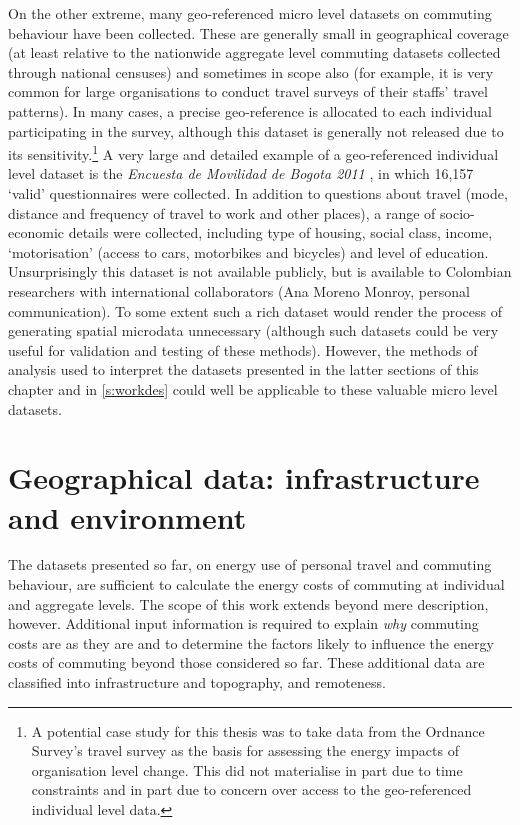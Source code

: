 On the other extreme, many geo-referenced micro level datasets on
commuting behaviour have been collected. These are generally small in geographical
coverage (at
least relative to the nationwide aggregate level commuting datasets
collected through national censuses) and sometimes in scope also (for example,
it is very common for large organisations to conduct travel surveys of their
staffs' travel patterns). In many cases, a precise geo-reference is allocated
to each individual participating in the survey, although this dataset is generally
not released due to its
sensitivity.\footnote{A
potential case study for this thesis was to take data from the Ordnance Survey's
travel survey as the basis for assessing the energy impacts of organisation level
change. This did not materialise in part due to time constraints and in part
due to concern over access to the geo-referenced individual level data.
}
A very large and detailed example of a geo-referenced individual level dataset
is the \emph{Encuesta de Movilidad de Bogota 2011} \citep{bogota2012}, in which 16,157 `valid'
questionnaires were collected. In addition to questions about travel
(mode, distance and frequency of travel to work and other places), a
range of socio-economic details were collected, including type of housing,
social class, income, `motorisation' (access to cars, motorbikes and bicycles)
and level of education. Unsurprisingly this dataset is not available publicly,
but is available to Colombian researchers with international collaborators
(Ana Moreno Monroy, personal communication). To some extent such a rich dataset
would render the process of generating spatial microdata unnecessary
(although such datasets could be very useful for validation and testing of
these methods). However, the methods of analysis used to interpret the
datasets presented in the latter sections of this chapter and in \cref{s:workdes}
could well be applicable to these valuable micro level datasets.

\section{Geographical data: infrastructure and environment} \label{sadditional}
The datasets presented so far, on energy use of personal travel and commuting
behaviour, are sufficient to calculate the energy costs of commuting at
individual and aggregate levels. The scope of this work extends beyond mere
description, however. Additional input information is required to explain \emph{why}
commuting costs are as they are and to determine the factors likely to
influence the energy costs of commuting beyond those considered so far. These
additional data are classified into infrastructure and topography,
and
remoteness.

